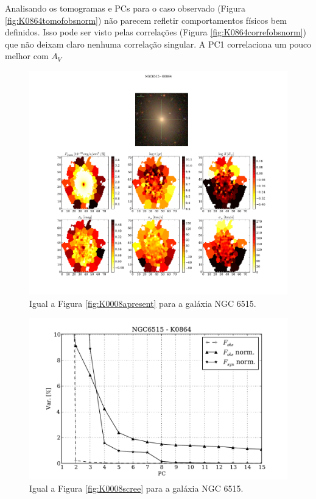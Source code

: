Analisando os tomogramas e PCs para o caso observado (Figura \ref{fig:K0864tomofobsnorm}) não parecem refletir
comportamentos físicos bem definidos. Isso pode ser visto pelas correlações (Figura \ref{fig:K0864correfobsnorm}) que
não deixam claro nenhuma correlação singular. A PC1 correlaciona um pouco melhor com $A_V$
\begin{figure}
    \includegraphics[width=1.\textwidth]{figuras/K0864-apresent.pdf}
    \caption[Propriedades f\'isicas da gal\'axia NGC 6515.]
    {Igual a Figura \ref{fig:K0008apresent} para a galáxia NGC 6515.}
    \label{fig:K0864apresent}
\end{figure}

\begin{figure}
    \includegraphics[height=0.33\textheight]{figuras/K0864-screetest.pdf}
    \caption[Scree test comparativo entre 3 PCAs - NGC 6515.]
	{Igual a Figura \ref{fig:K0008scree} para a galáxia NGC 6515.}
    \label{fig:K0864scree}
\end{figure}

